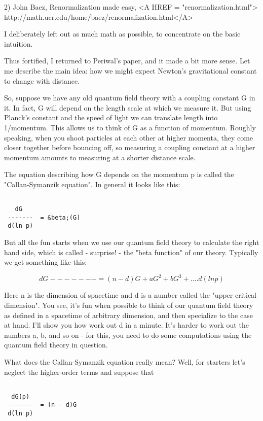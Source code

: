 2) John Baez, Renormalization made easy, <A HREF = "renormalization.html">
http://math.ucr.edu/home/baez/renormalization.html</A>

I deliberately left out as much math as possible, to concentrate 
on the basic intuition.

Thus fortified, I returned to Periwal's paper, and it made a bit 
more sense.  Let me describe the main idea: how we might expect 
Newton's gravitational constant to change with distance.  

So, suppose we have any old quantum field theory with a coupling constant
G in it.  In fact, G will depend on the length scale at which we
measure it.  But using Planck's constant and the speed of light we
can translate length into 1/momentum.  This allows us to think of G
as a function of momentum.   Roughly speaking, when you shoot particles 
at each other at higher momenta, they come closer together before 
bouncing off, so measuring a coupling constant at a higher momentum 
amounts to measuring at a shorter distance scale.  

The equation describing how G depends on the momentum p is called 
the "Callan-Symanzik equation".  In general it looks like this:


\begin{verbatim}

   dG
 -------  = &beta;(G)
 d(ln p)
\end{verbatim}
    
But all the fun starts when we use our quantum field theory to calculate 
the right hand side, which is called - surprise! - the "beta function" 
of our theory.   Typically we get something like this:


$$

   dG 
 -------  = (n - d)G + aG^{2} + bG^{3} + ....
 d(ln p)
$$
    
Here n is the dimension of spacetime and d is a number called the
"upper critical dimension".  You see, it's fun when possible to think
of our quantum field theory as defined in a spacetime of arbitrary
dimension, and then specialize to the case at hand.  I'll show you 
how work out d in a minute.  It's harder to work out the numbers 
a, b, and so on - for this, you need to do some computations using the 
quantum field theory in question.

What does the Callan-Symanzik equation really mean?  Well, for starters 
let's neglect the higher-order terms and suppose that


\begin{verbatim}

  dG(p) 
 -------  = (n - d)G
 d(ln p)
\end{verbatim}
    
